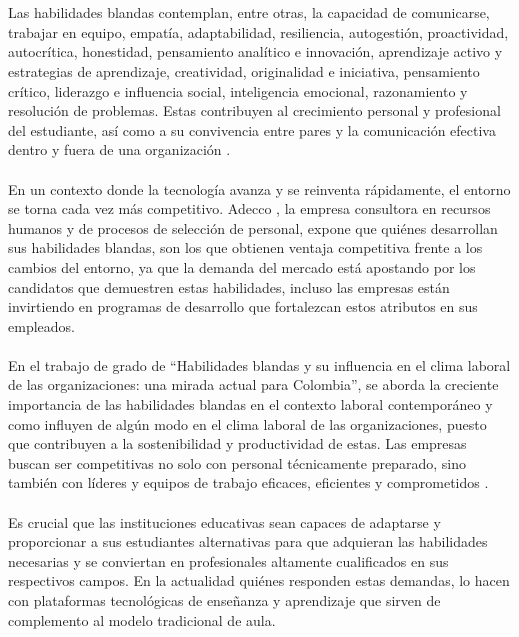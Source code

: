\\
\\
Las habilidades blandas contemplan, entre otras, la capacidad de comunicarse, trabajar en equipo, empatía, adaptabilidad, resiliencia, autogestión, proactividad, autocrítica, honestidad, pensamiento analítico e innovación, aprendizaje activo y estrategias de aprendizaje, creatividad, originalidad e iniciativa, pensamiento crítico, liderazgo e influencia social, inteligencia emocional, razonamiento y resolución de problemas. Estas contribuyen al crecimiento personal y profesional del estudiante, así como a su convivencia entre pares y la comunicación efectiva dentro y fuera de una organización \cite{CepedaGuerra2021}. 
\\
\\
En un contexto donde la tecnología avanza y se reinventa rápidamente, el entorno se torna cada vez más competitivo. Adecco \cite{Adecco2024}, la empresa consultora en recursos humanos y de procesos de selección de personal, expone que quiénes desarrollan sus habilidades blandas, son los que obtienen ventaja competitiva frente a los cambios del entorno, ya que la demanda del mercado está apostando por los candidatos que demuestren estas habilidades, incluso las empresas están invirtiendo en programas de desarrollo que fortalezcan estos atributos en sus empleados. 
\\
\\
En el trabajo de grado de “Habilidades blandas y su influencia en el clima laboral de las organizaciones: una mirada actual para Colombia”, se aborda la creciente importancia de las habilidades blandas en el contexto laboral contemporáneo y como influyen de algún modo en el clima laboral de las organizaciones, puesto que contribuyen a la sostenibilidad y productividad de estas. Las empresas buscan ser competitivas no solo con personal técnicamente preparado, sino también con líderes y equipos de trabajo eficaces, eficientes y comprometidos \cite{PerdomoRamos2023}.
\\
\\
Es crucial que las instituciones educativas sean capaces de adaptarse y proporcionar a sus estudiantes alternativas para que adquieran las habilidades necesarias y se conviertan en profesionales altamente cualificados en sus respectivos campos. En la actualidad quiénes responden estas demandas, lo hacen con plataformas tecnológicas de enseñanza y aprendizaje que sirven de complemento al modelo tradicional de aula. 
\\
\\
